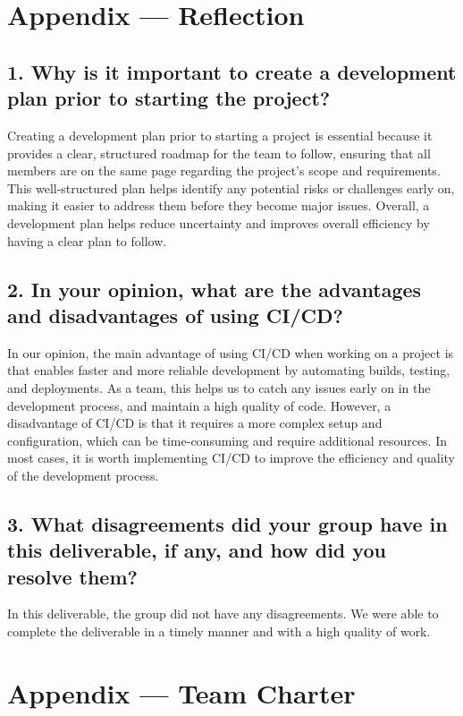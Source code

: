 \documentclass{article}
\begin{document}
\newpage{}

\section*{Appendix --- Reflection}

\subsection*{1. Why is it important to create a development plan prior to starting the project?}
Creating a development plan prior to starting a project is essential because it provides a clear, structured roadmap for the team to follow, ensuring that all members are on the same page regarding the project's scope and requirements. This well-structured plan helps identify any potential risks or challenges early on, making it easier to address them before they become major issues. Overall, a development plan helps reduce uncertainty and improves overall efficiency by having a clear plan to follow.

\subsection*{2. In your opinion, what are the advantages and disadvantages of using CI/CD?}
In our opinion, the main advantage of using CI/CD when working on a project is that enables faster and more reliable development by automating builds, testing, and deployments. As a team, this helps us to catch any issues early on in the development process, and maintain a high quality of code. However, a disadvantage of CI/CD is that it requires a more complex setup and configuration, which can be time-consuming and require additional resources. In most cases, it is worth implementing CI/CD to improve the efficiency and quality of the development process.

\subsection*{3. What disagreements did your group have in this deliverable, if any, and how did you resolve them?}
In this deliverable, the group did not have any disagreements. We were able to complete the deliverable in a timely manner and with a high quality of work.

\newpage{}

\section*{Appendix --- Team Charter}
\end{document}
